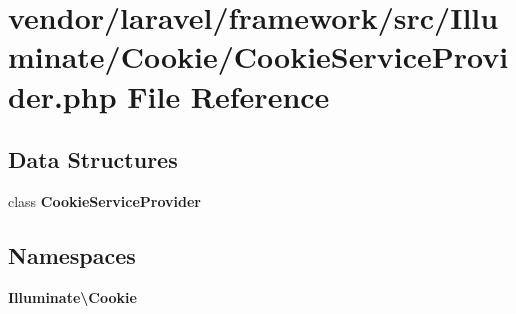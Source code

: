 \section{vendor/laravel/framework/src/\+Illuminate/\+Cookie/\+Cookie\+Service\+Provider.php File Reference}
\label{_cookie_service_provider_8php}
\subsection*{Data Structures}
\begin{DoxyCompactItemize}
\item 
class {\bf Cookie\+Service\+Provider}
\end{DoxyCompactItemize}
\subsection*{Namespaces}
\begin{DoxyCompactItemize}
\item 
 {\bf Illuminate\textbackslash{}\+Cookie}
\end{DoxyCompactItemize}
